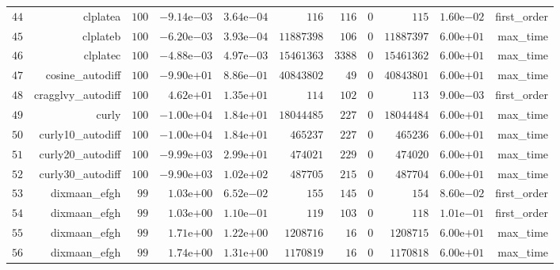 \documentclass[varwidth=20cm,crop=true]{standalone}
\begin{document}
\begin{longtable}{rrrrrrrrrrr}
  \(    44\) & clplatea & \(   100\) & \(-9.14\)e\(-03\) & \( 3.64\)e\(-04\) & \(   116\) & \(   116\) & \(     0\) & \(   115\) & \( 1.60\)e\(-02\) & first\_order \\
  \(    45\) & clplateb & \(   100\) & \(-6.20\)e\(-03\) & \( 3.93\)e\(-04\) & \(11887398\) & \(   106\) & \(     0\) & \(11887397\) & \( 6.00\)e\(+01\) & max\_time \\
  \(    46\) & clplatec & \(   100\) & \(-4.88\)e\(-03\) & \( 4.97\)e\(-03\) & \(15461363\) & \(  3388\) & \(     0\) & \(15461362\) & \( 6.00\)e\(+01\) & max\_time \\
  \(    47\) & cosine\_autodiff & \(   100\) & \(-9.90\)e\(+01\) & \( 8.86\)e\(-01\) & \(40843802\) & \(    49\) & \(     0\) & \(40843801\) & \( 6.00\)e\(+01\) & max\_time \\
  \(    48\) & cragglvy\_autodiff & \(   100\) & \( 4.62\)e\(+01\) & \( 1.35\)e\(+01\) & \(   114\) & \(   102\) & \(     0\) & \(   113\) & \( 9.00\)e\(-03\) & first\_order \\
  \(    49\) & curly & \(   100\) & \(-1.00\)e\(+04\) & \( 1.84\)e\(+01\) & \(18044485\) & \(   227\) & \(     0\) & \(18044484\) & \( 6.00\)e\(+01\) & max\_time \\
  \(    50\) & curly10\_autodiff & \(   100\) & \(-1.00\)e\(+04\) & \( 1.84\)e\(+01\) & \(465237\) & \(   227\) & \(     0\) & \(465236\) & \( 6.00\)e\(+01\) & max\_time \\
  \(    51\) & curly20\_autodiff & \(   100\) & \(-9.99\)e\(+03\) & \( 2.99\)e\(+01\) & \(474021\) & \(   229\) & \(     0\) & \(474020\) & \( 6.00\)e\(+01\) & max\_time \\
  \(    52\) & curly30\_autodiff & \(   100\) & \(-9.90\)e\(+03\) & \( 1.02\)e\(+02\) & \(487705\) & \(   215\) & \(     0\) & \(487704\) & \( 6.00\)e\(+01\) & max\_time \\
  \(    53\) & dixmaan\_efgh & \(    99\) & \( 1.03\)e\(+00\) & \( 6.52\)e\(-02\) & \(   155\) & \(   145\) & \(     0\) & \(   154\) & \( 8.60\)e\(-02\) & first\_order \\
  \(    54\) & dixmaan\_efgh & \(    99\) & \( 1.03\)e\(+00\) & \( 1.10\)e\(-01\) & \(   119\) & \(   103\) & \(     0\) & \(   118\) & \( 1.01\)e\(-01\) & first\_order \\
  \(    55\) & dixmaan\_efgh & \(    99\) & \( 1.71\)e\(+00\) & \( 1.22\)e\(+00\) & \(1208716\) & \(    16\) & \(     0\) & \(1208715\) & \( 6.00\)e\(+01\) & max\_time \\
  \(    56\) & dixmaan\_efgh & \(    99\) & \( 1.74\)e\(+00\) & \( 1.31\)e\(+00\) & \(1170819\) & \(    16\) & \(     0\) & \(1170818\) & \( 6.00\)e\(+01\) & max\_time \\

\end{longtable}
\end{document}
